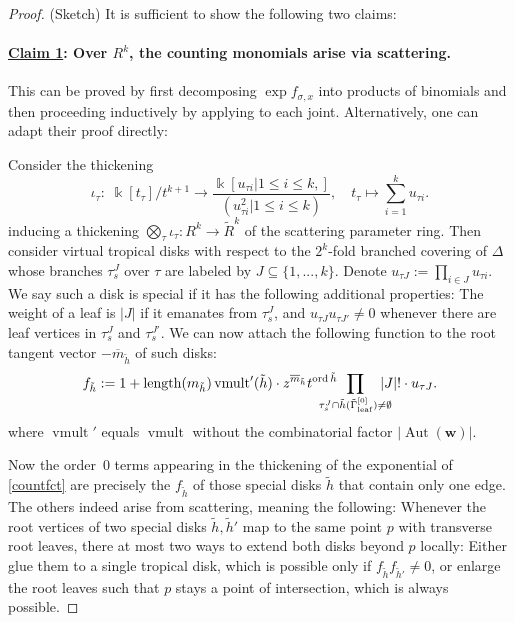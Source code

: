 \documentclass[11pt,letter]{amsart}
\theoremstyle{definition}
\theoremstyle{remark}
\numberwithin{equation}{section}
\numberwithin{figure}{section}
\newcommand{\length}{\operatorname{length}}
\newcommand{\vvert}{\tilde \Gamma^{[0]}_{\mathrm{leaf}}}
\newcommand {\Aut}  {\operatorname{Aut}}
\newcommand {\kk} {\Bbbk}
\newcommand {\lra}  {\longrightarrow}
\newcommand {\ord}  {\operatorname{ord}}
\newcommand {\vmult} {\operatorname{vmult}}
\begin{document}
\begin{proof} (Sketch)
It is sufficient to show the following two claims: \paragraph{\underline{Claim
1}: Over $R^k$, the counting monomials arise via scattering.} This can be proved
by first decomposing $\exp f_{\sigma,x} $ into products of binomials and then
proceeding inductively by applying \cite[Thm.\,2.7]{gps} to each joint.
Alternatively, one can adapt their proof directly:

Consider the thickening
\[
\iota_\tau: \; \kk[t_\tau ]/t^{k+1} \lra \frac{\kk[u_{\tau i} | 1\leq i
\leq k, ]}{(u_{\tau i}^2 | 1\leq i \leq k )  },\quad t_{\tau}
\longmapsto \sum_{i=1}^{k} u_{\tau i}.
\]
inducing a thickening $\bigotimes_{ \tau} \iota_{ \tau}: R^k\to \tilde R^k$ of
the scattering parameter ring. Then consider virtual tropical disks with respect
to the $2^k$-fold branched covering of $\Delta$ whose branches $\tau_s^J$ over
$\tau$ are labeled by $J \subseteq \{1,...,k\}$. Denote $u_{\tau J}:=
\prod_{i\in J}u_{\tau i}$. We say such a disk is special if it has the
following additional properties: The weight of a leaf is $|J|$ if it emanates
from $\tau_s^J$, and $u_{\tau J} u_{\tau J'} \not = 0$ whenever there are leaf
vertices in $\tau_s^J$ and $\tau_s^{J'}$. We can now attach the following
function to the root tangent vector $-\overline m_{\tilde h}$ of such disks:
\begin{equation}
\label{f_h}
f_{\tilde h} :=   1 + \length(m_{\tilde h}) \vmult'(\tilde h) \cdot
z^{\overline m_{\tilde h}}t^{\ord \tilde h}   \hspace{-1.5em}
\prod_{\tau^J_s \cap \tilde h(\vvert) \not = \emptyset} \hspace {-1em}  |J|!
\cdot u_{\tau J}.
\end{equation}
where $\vmult'$ equals $\vmult$ without the combinatorial factor $|\Aut(\mathbf w)|$.

Now the order~0 terms appearing in the thickening of the exponential of
\eqref{countfct} are precisely the $f_{\tilde h}$ of those special disks $\tilde
h$ that contain only one edge. The others indeed arise from scattering, meaning
the following: Whenever the root vertices of two special disks $\tilde h, \tilde
h'$ map to the same point $p$ with transverse root leaves, there at most two
ways to extend both disks beyond $p$ locally: Either glue them to a single
tropical disk, which is possible only if $f_{\tilde h}f_{\tilde h'}\not = 0$, or
enlarge the root leaves such that $p$ stays a point of intersection, which is
always possible.


\end{proof}
\end{document}
